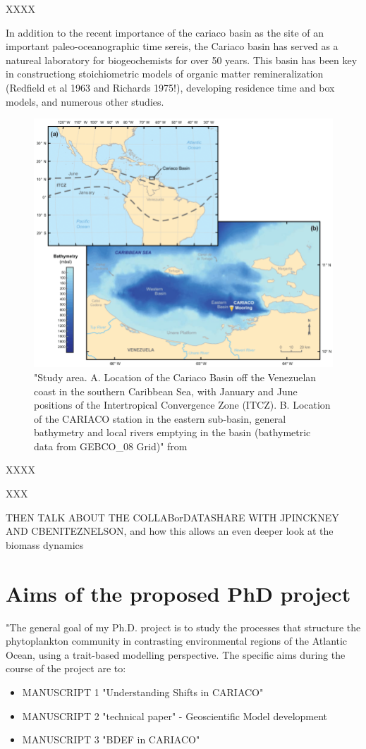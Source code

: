 XXXX

In addition to the recent importance of the cariaco basin as the site of an important paleo-oceanographic time sereis, the Cariaco basin has served as a natureal laboratory for biogeochemists for over 50 years. This basin has been key in constructiong stoichiometric models of organic matter remineralization (Redfield et al 1963 and Richards 1975!), developing residence time and box models, and numerous other studies.

\begin{figure}
\centering
\includegraphics[trim = 0mm 0mm 0mm 0mm, clip, width=1.\linewidth]{./Chp1-Intro/CARIACObasinMAP_Bringueetal2018.png}
\caption[Scheme]{\small {"Study area. A. Location of the Cariaco Basin off the Venezuelan coast in the southern Caribbean Sea, with January and June positions of the Intertropical Convergence Zone (ITCZ). B. Location of the CARIACO station in the eastern sub-basin, general bathymetry and local rivers emptying in the basin (bathymetric data from GEBCO\_08 Grid)" from \cite{Bringue2019}}}
\label{CARIACO-map}
\end{figure}

XXXX

XXX

THEN TALK ABOUT THE COLLABorDATASHARE WITH JPINCKNEY AND CBENITEZNELSON, and how this allows an even deeper look at the biomass dynamics


\section{Aims of the proposed PhD project}
"The general goal of my Ph.D. project is to study the processes that structure the phytoplankton community in contrasting environmental regions of the Atlantic Ocean, using a trait-based modelling perspective. The specific aims during the course of the project are to:

\begin{itemize}
\item MANUSCRIPT 1 "Understanding Shifts in CARIACO"
\item MANUSCRIPT 2 "technical paper" - Geoscientific Model development
\item MANUSCRIPT 3 "BDEF in CARIACO"
\end{itemize}
